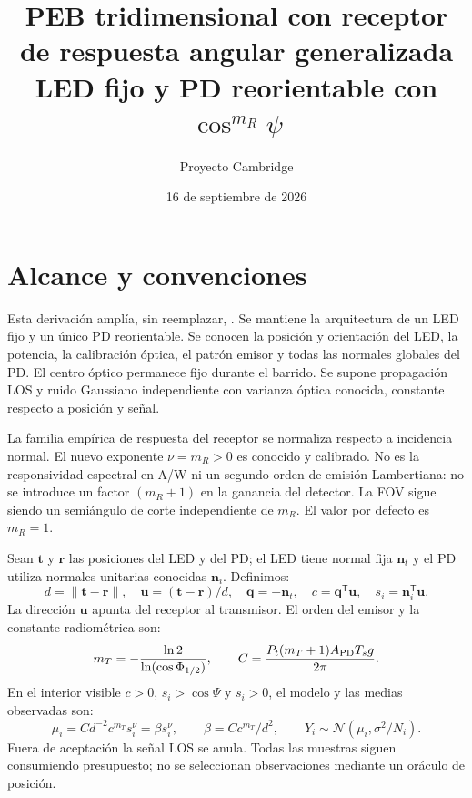 \documentclass[11pt,a4paper]{article}
\title{PEB tridimensional con receptor de respuesta angular generalizada\\\large LED fijo y PD reorientable con $\cos^{m_R}\psi$}
\author{Proyecto Cambridge}
\date{16 de septiembre de 2026}
\begin{document}
\maketitle

\section{Alcance y convenciones}
Esta derivación amplía, sin reemplazar, . Se mantiene la arquitectura de un LED fijo y un único PD reorientable. Se conocen la posición y orientación del LED, la potencia, la calibración óptica, el patrón emisor y todas las normales globales del PD. El centro óptico permanece fijo durante el barrido. Se supone propagación LOS y ruido Gaussiano independiente con varianza óptica conocida, constante respecto a posición y señal.

La familia empírica de respuesta del receptor se normaliza respecto a incidencia normal. El nuevo exponente $\nu=m_R>0$ es conocido y calibrado. No es la responsividad espectral en A/W ni un segundo orden de emisión Lambertiana: no se introduce un factor $(m_R+1)$ en la ganancia del detector. La FOV sigue siendo un semiángulo de corte independiente de $m_R$. El valor por defecto es $m_R=1$.

Sean $\mathbf t$ y $\mathbf r$ las posiciones del LED y del PD; el LED tiene normal fija $\mathbf n_t$ y el PD utiliza normales unitarias conocidas $\mathbf n_i$. Definimos:
\begin{equation}
 d=\|\mathbf t-\mathbf r\|,\quad \mathbf u=(\mathbf t-\mathbf r)/d,\quad
 \mathbf q=-\mathbf n_t,\quad c=\mathbf q^{\mathsf T}\mathbf u,\quad s_i=\mathbf n_i^{\mathsf T}\mathbf u.
\end{equation}
La dirección $\mathbf u$ apunta del receptor al transmisor. El orden del emisor y la constante radiométrica son:
\begin{equation}
 m_T=-\frac{\ln2}{\ln(\cos\Phi_{1/2})},\qquad
 C=\frac{P_t(m_T+1)A_{\rm PD}T_s g}{2\pi}.
\end{equation}
En el interior visible $c>0$, $s_i>\cos\Psi$ y $s_i>0$, el modelo y las medias observadas son:
\begin{equation}
 \mu_i=C d^{-2}c^{m_T}s_i^\nu=\beta s_i^\nu,\qquad
 \beta=Cc^{m_T}/d^2,\qquad
 \bar Y_i\sim\mathcal N(\mu_i,\sigma^2/N_i).
\label{eq:model}
\end{equation}
Fuera de aceptación la señal LOS se anula. Todas las muestras siguen consumiendo presupuesto; no se seleccionan observaciones mediante un oráculo de posición.
\end{document}
